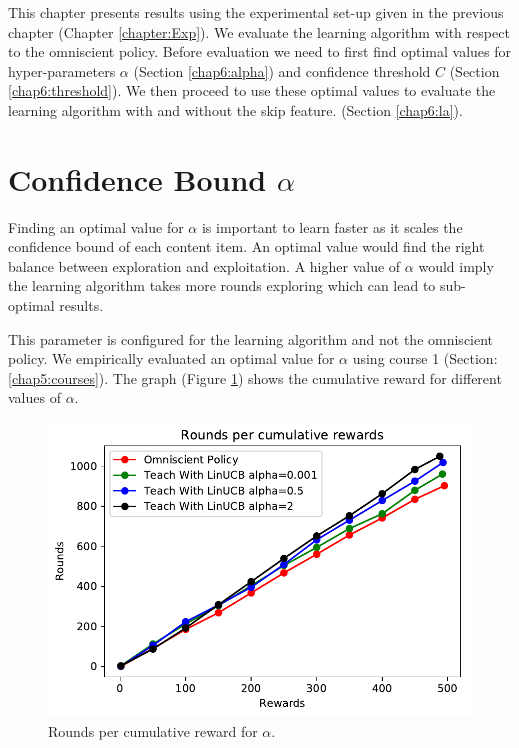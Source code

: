 \label{chapter:eval}

This chapter presents results using the experimental set-up given in the previous chapter (Chapter \ref{chapter:Exp}). We evaluate the learning algorithm with respect to the omniscient policy. Before evaluation we need to first find optimal values for hyper-parameters $\alpha$ (Section \ref{chap6:alpha}) and confidence threshold $C$ (Section \ref{chap6:threshold}). We then proceed to use these optimal values to evaluate the learning algorithm with and without the skip feature. (Section \ref{chap6:la}). 


\section{Confidence Bound $\alpha$ \label{chap6:alpha}}

Finding an optimal value for $\alpha$ is important to learn faster as it scales the confidence bound of each content item. An optimal value would find the right balance between exploration and exploitation. A higher value of $\alpha$ would imply the learning algorithm takes more rounds exploring which can lead to sub-optimal results. \par

This parameter is configured for the learning algorithm and not the omniscient policy. We empirically evaluated an optimal value for $\alpha$ using course 1 (Section: \ref{chap5:courses}). The graph (Figure \ref{chap6:rpr_alpha}) shows the cumulative reward for different values of $\alpha$. \par


\begin{figure}[H]
    \centering
    \includegraphics[scale=1.0]{Figures/rounds_per_reward_for_alpha.pdf}
    \caption{Rounds per cumulative reward for $\alpha$.}
    \label{chap6:rpr_alpha}
\end{figure}

